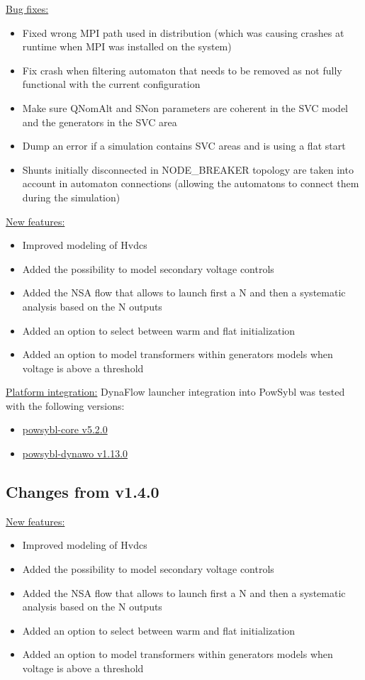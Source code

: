 \documentclass[a4paper, 12pt]{report}
\begin{document}
\underline{Bug fixes:}

\begin{itemize}
\item Fixed wrong MPI path used in distribution (which was causing crashes at runtime when MPI was installed on the system)
\item Fix crash when filtering automaton that needs to be removed as not fully functional with the current configuration
\item Make sure QNomAlt and SNon parameters are coherent in the SVC model and the generators in the SVC area
\item Dump an error if a simulation contains SVC areas and is using a flat start
\item Shunts initially disconnected in NODE\_BREAKER topology are taken into account in automaton connections (allowing the automatons to connect them during the simulation)
\end{itemize}

\underline{New features:}
\begin{itemize}
\item Improved modeling of Hvdcs
\item Added the possibility to model secondary voltage controls
\item Added the NSA flow that allows to launch first a N and then a systematic analysis based on the N outputs
\item Added an option to select between warm and flat initialization
\item Added an option to model transformers within generators models when voltage is above a threshold
\end{itemize}

\underline{Platform integration:}
DynaFlow launcher integration into PowSybl was tested with the following versions:
\begin{itemize}
\item \href{https://github.com/powsybl/powsybl-core/releases/tag/v5.2.0}{powsybl-core v5.2.0}
\item \href{https://github.com/powsybl/powsybl-dynawo/releases/tag/v1.13.0}{powsybl-dynawo v1.13.0}
\end{itemize}

\subsection{Changes from v1.4.0}

\underline{New features:}
\begin{itemize}
\item Improved modeling of Hvdcs
\item Added the possibility to model secondary voltage controls
\item Added the NSA flow that allows to launch first a N and then a systematic analysis based on the N outputs
\item Added an option to select between warm and flat initialization
\item Added an option to model transformers within generators models when voltage is above a threshold
\end{itemize}
\end{document}
